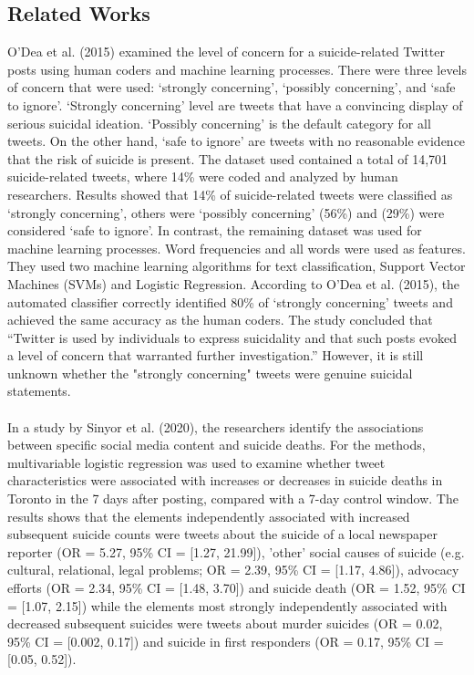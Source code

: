 \documentclass[runningheads]{llncs}
\begin{document}
\subsection{Related Works}
O’Dea et al. (2015) examined the level of concern for a suicide-related Twitter posts using human coders and machine learning processes. There were three levels of concern that were used: ‘strongly concerning’, ‘possibly concerning’, and ‘safe to ignore’. ‘Strongly concerning’ level are tweets that have a convincing display of serious suicidal ideation. ‘Possibly concerning’ is the default category for all tweets. On the other hand, ‘safe to ignore’ are tweets with no reasonable evidence that the risk of suicide is present. The dataset used contained a total of 14,701 suicide-related tweets, where 14\% were coded and analyzed by human researchers. Results showed that 14\% of suicide-related tweets were classified as ‘strongly concerning’, others were ‘possibly concerning’ (56\%) and (29\%) were considered ‘safe to ignore’. In contrast, the remaining dataset was used for machine learning processes. Word frequencies and all words were used as features. They used two machine learning algorithms for text classification, Support Vector Machines (SVMs) and Logistic Regression. According to O’Dea et al. (2015), the automated classifier correctly identified 80\% of ‘strongly concerning’ tweets and achieved the same accuracy as the human coders. The study concluded that “Twitter is used by individuals to express suicidality and that such posts evoked a level of concern that warranted further investigation.” However, it is still unknown whether the "strongly concerning" tweets were genuine suicidal statements.
\paragraph{}
In a study by Sinyor et al.  (2020), the researchers identify the associations between specific social media content and suicide deaths. For the methods, multivariable logistic regression was used to examine whether tweet characteristics were associated with increases or decreases in suicide deaths in Toronto in the 7 days after posting, compared with a 7-day control window. The results shows that the elements independently associated with increased subsequent suicide counts were tweets about the suicide of a local newspaper reporter (OR = 5.27, 95\% CI = [1.27, 21.99]), 'other' social causes of suicide (e.g. cultural, relational, legal problems; OR = 2.39, 95\% CI = [1.17, 4.86]), advocacy efforts (OR = 2.34, 95\% CI = [1.48, 3.70]) and suicide death (OR = 1.52, 95\% CI = [1.07, 2.15]) while the elements most strongly independently associated with decreased subsequent suicides were tweets about murder suicides (OR = 0.02, 95\% CI = [0.002, 0.17]) and suicide in first responders (OR = 0.17, 95\% CI = [0.05, 0.52]).
\end{document}
